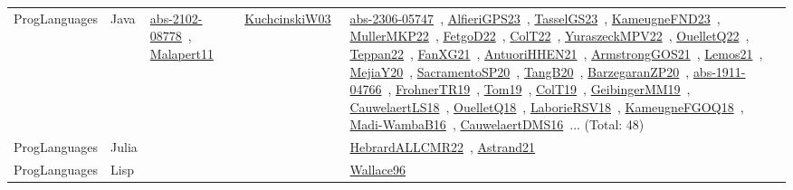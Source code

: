 {\begin{longtable}{lp{3cm}>{\raggedright\arraybackslash}p{6cm}>{\raggedright\arraybackslash}p{6cm}>{\raggedright\arraybackslash}p{8cm}}
ProgLanguages & Java & \href{works/abs-2102-08778.pdf}{abs-2102-08778}~\cite{abs-2102-08778}, \href{works/Malapert11.pdf}{Malapert11}~\cite{Malapert11} & \href{works/KuchcinskiW03.pdf}{KuchcinskiW03}~\cite{KuchcinskiW03} & \href{works/abs-2306-05747.pdf}{abs-2306-05747}~\cite{abs-2306-05747}, \href{works/AlfieriGPS23.pdf}{AlfieriGPS23}~\cite{AlfieriGPS23}, \href{works/TasselGS23.pdf}{TasselGS23}~\cite{TasselGS23}, \href{works/KameugneFND23.pdf}{KameugneFND23}~\cite{KameugneFND23}, \href{works/MullerMKP22.pdf}{MullerMKP22}~\cite{MullerMKP22}, \href{works/FetgoD22.pdf}{FetgoD22}~\cite{FetgoD22}, \href{works/ColT22.pdf}{ColT22}~\cite{ColT22}, \href{works/YuraszeckMPV22.pdf}{YuraszeckMPV22}~\cite{YuraszeckMPV22}, \href{works/OuelletQ22.pdf}{OuelletQ22}~\cite{OuelletQ22}, \href{works/Teppan22.pdf}{Teppan22}~\cite{Teppan22}, \href{works/FanXG21.pdf}{FanXG21}~\cite{FanXG21}, \href{works/AntuoriHHEN21.pdf}{AntuoriHHEN21}~\cite{AntuoriHHEN21}, \href{works/ArmstrongGOS21.pdf}{ArmstrongGOS21}~\cite{ArmstrongGOS21}, \href{works/Lemos21.pdf}{Lemos21}~\cite{Lemos21}, \href{works/MejiaY20.pdf}{MejiaY20}~\cite{MejiaY20}, \href{works/SacramentoSP20.pdf}{SacramentoSP20}~\cite{SacramentoSP20}, \href{works/TangB20.pdf}{TangB20}~\cite{TangB20}, \href{works/BarzegaranZP20.pdf}{BarzegaranZP20}~\cite{BarzegaranZP20}, \href{works/abs-1911-04766.pdf}{abs-1911-04766}~\cite{abs-1911-04766}, \href{works/FrohnerTR19.pdf}{FrohnerTR19}~\cite{FrohnerTR19}, \href{works/Tom19.pdf}{Tom19}~\cite{Tom19}, \href{works/ColT19.pdf}{ColT19}~\cite{ColT19}, \href{works/GeibingerMM19.pdf}{GeibingerMM19}~\cite{GeibingerMM19}, \href{works/CauwelaertLS18.pdf}{CauwelaertLS18}~\cite{CauwelaertLS18}, \href{works/OuelletQ18.pdf}{OuelletQ18}~\cite{OuelletQ18}, \href{works/LaborieRSV18.pdf}{LaborieRSV18}~\cite{LaborieRSV18}, \href{works/KameugneFGOQ18.pdf}{KameugneFGOQ18}~\cite{KameugneFGOQ18}, \href{works/Madi-WambaB16.pdf}{Madi-WambaB16}~\cite{Madi-WambaB16}, \href{works/CauwelaertDMS16.pdf}{CauwelaertDMS16}~\cite{CauwelaertDMS16}... (Total: 48)\\
ProgLanguages & Julia &  &  & \href{works/HebrardALLCMR22.pdf}{HebrardALLCMR22}~\cite{HebrardALLCMR22}, \href{works/Astrand21.pdf}{Astrand21}~\cite{Astrand21}\\
ProgLanguages & Lisp &  &  & \href{works/Wallace96.pdf}{Wallace96}~\cite{Wallace96}\\

\end{longtable}}
